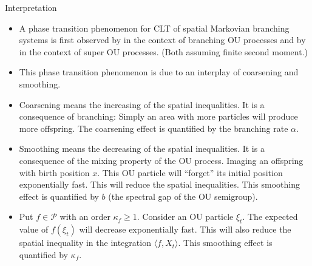\documentclass[9pt]{beamer}
\begin{document}
\begin{frame}{Interpretation}
\begin{itemize}
\item
	A phase transition phenomenon for CLT of spatial Markovian branching systems is first observed by \cite{AdamczakMilos2015CLT} in the context of branching OU processes and by \cite{Milos2018Spatial} in the context of super OU processes. (Both assuming finite second moment.)
\item
	This phase transition phenomenon is due to an interplay of coarsening and smoothing. 
\item
	Coarsening means the increasing of the spatial inequalities. It is a consequence of branching: Simply an area with more particles will produce more offspring. The coarsening effect is quantified by the branching rate $\alpha$.
\item
	Smoothing means the decreasing of the spatial inequalities. 
	It is a consequence of the mixing property of the OU process. Imaging an offspring with birth position $x$. This OU particle will ``forget'' its initial position exponentially fast. This will reduce the spatial inequalities. 
	This smoothing effect is quantified by $b$ (the spectral gap of the OU semigroup).
\item
	Put $f\in \mathcal P$ with an order $\kappa_f \geq 1$. Consider an OU particle $\xi_t$. The expected value of $f(\xi_t)$ will decrease exponentially fast. This will also reduce the spatial inequality in the integration $\langle f,X_t\rangle$. 
	This smoothing effect is quantified by $\kappa_f$.
\end{itemize}
\end{frame}
\end{document}
